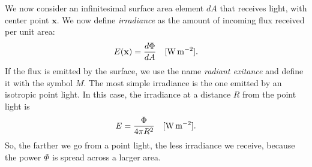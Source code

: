 We now consider an infinitesimal surface area element $dA$ that receives light, with center point $\mathbf{x}$. We now define \emph{irradiance} as the amount of incoming flux received per unit area:
\begin{equation*}
E(\mathbf{x}) = \frac{d \Phi}{d A}  \ \ \ [\SI{}{\watt \per \square \metre}].
\end{equation*}
If the flux is emitted by the surface, we use the name \emph{radiant exitance} and define it with the symbol $M$.
The most simple irradiance is the one emitted by an isotropic point light. In this case, the irradiance at a distance $R$ from the point light is 
\begin{equation*}
E = \frac{\Phi}{4 \pi R^2} \ \ \ [\SI{}{\watt \per \square \metre}].
\end{equation*}
So, the farther we go from a point light, the less irradiance we receive, because the power $\Phi$ is spread across a larger area.

